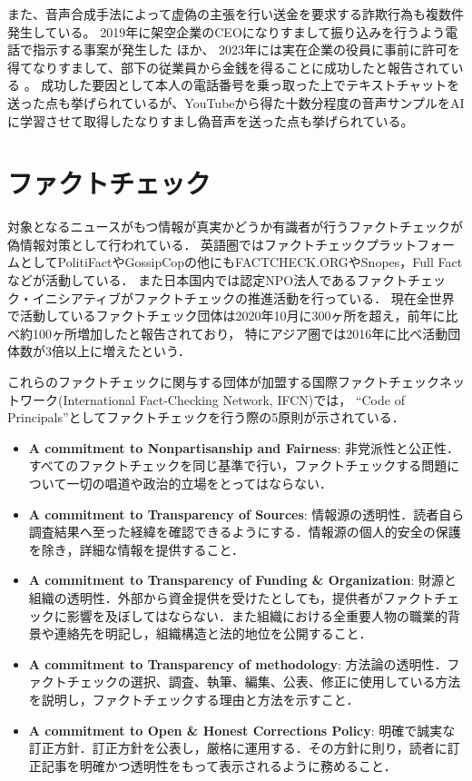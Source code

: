 また、音声合成手法によって虚偽の主張を行い送金を要求する詐欺行為も複数件発生している。
2019年に架空企業のCEOになりすまして振り込みを行うよう電話で指示する事案が発生した \cite{Stupp_2019}ほか、
2023年には実在企業の役員に事前に許可を得てなりすまして、部下の従業員から金銭を得ることに成功したと報告されている \cite{Bunn_2023}。
成功した要因として本人の電話番号を乗っ取った上でテキストチャットを送った点も挙げられているが、YouTubeから得た十数分程度の音声サンプルをAIに学習させて取得したなりすまし偽音声を送った点も挙げられている。


\section{ファクトチェック}
対象となるニュースがもつ情報が真実かどうか有識者が行うファクトチェックが偽情報対策として行われている．
英語圏ではファクトチェックプラットフォームとしてPolitiFactやGossipCopの他にもFACTCHECK.ORGやSnopes，Full Factなどが活動している．
また日本国内では認定NPO法人であるファクトチェック・イニシアティブがファクトチェックの推進活動を行っている．
現在全世界で活動しているファクトチェック団体は2020年10月に300ヶ所を超え，前年に比べ約100ヶ所増加したと報告されており，
特にアジア圏では2016年に比べ活動団体数が3倍以上に増えたという\cite{stencel_luther_2020}．

これらのファクトチェックに関与する団体が加盟する国際ファクトチェックネットワーク(International Fact-Checking Network, IFCN)では，
``Code of Principals''としてファクトチェックを行う際の5原則が示されている\cite{IFCN,fij}．

\begin{itemize}
    \item \textbf{A commitment to Nonpartisanship and Fairness}: 非党派性と公正性．すべてのファクトチェックを同じ基準で行い，ファクトチェックする問題について一切の唱道や政治的立場をとってはならない．
    \item \textbf{A commitment to Transparency of Sources}: 情報源の透明性．読者自ら調査結果へ至った経緯を確認できるようにする．情報源の個人的安全の保護を除き，詳細な情報を提供すること．
    \item \textbf{A commitment to Transparency of Funding \& Organization}: 財源と組織の透明性．外部から資金提供を受けたとしても，提供者がファクトチェックに影響を及ぼしてはならない．また組織における全重要人物の職業的背景や連絡先を明記し，組織構造と法的地位を公開すること．
    \item \textbf{A commitment to Transparency of methodology}: 方法論の透明性．ファクトチェックの選択、調査、執筆、編集、公表、修正に使用している方法を説明し，ファクトチェックする理由と方法を示すこと．
    \item \textbf{A commitment to Open \& Honest Corrections Policy}: 明確で誠実な訂正方針．訂正方針を公表し，厳格に運用する．その方針に則り，読者に訂正記事を明確かつ透明性をもって表示されるように務めること．
\end{itemize}

